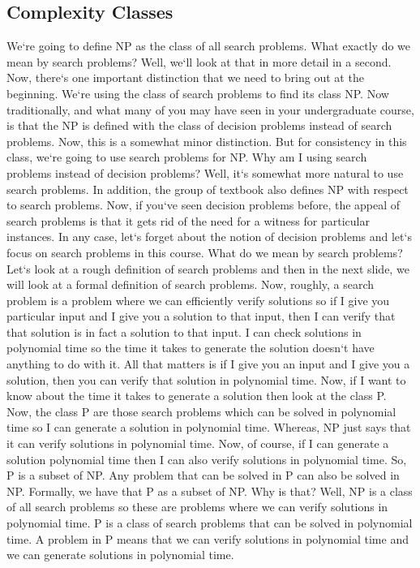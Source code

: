 \subsection{Complexity Classes}
We`re going to define NP as the class of all search problems.
What exactly do we mean by search problems? Well, we`ll look at that in more detail in a second.
Now, there`s one important distinction that we need to bring out at the beginning.
We`re using the class of search problems to find its class NP\@.
Now traditionally, and what many of you may have seen in your undergraduate course, is that the NP is defined with the class of decision problems instead of search problems.
Now, this is a somewhat minor distinction.
But for consistency in this class, we`re going to use search problems for NP\@.
Why am I using search problems instead of decision problems? Well, it`s somewhat more natural to use search problems.
In addition, the group of textbook also defines NP with respect to search problems.
Now, if you`ve seen decision problems before, the appeal of search problems is that it gets rid of the need for a witness for particular instances.
In any case, let`s forget about the notion of decision problems and let`s focus on search problems in this course.
What do we mean by search problems? Let`s look at a rough definition of search problems and then in the next slide, we will look at a formal definition of search problems.
Now, roughly, a search problem is a problem where we can efficiently verify solutions so if I give you particular input and I give you a solution to that input, then I can verify that that solution is in fact a solution to that input.
I can check solutions in polynomial time so the time it takes to generate the solution doesn`t have anything to do with it.
All that matters is if I give you an input and I give you a solution, then you can verify that solution in polynomial time.
Now, if I want to know about the time it takes to generate a solution then look at the class P\@.
Now, the class P are those search problems which can be solved in polynomial time so I can generate a solution in polynomial time.
Whereas, NP just says that it can verify solutions in polynomial time.
Now, of course, if I can generate a solution polynomial time then I can also verify solutions in polynomial time.
So, P is a subset of NP\@.
Any problem that can be solved in P can also be solved in NP\@.
Formally, we have that P as a subset of NP\@.
Why is that? Well, NP is a class of all search problems so these are problems where we can verify solutions in polynomial time.
P is a class of search problems that can be solved in polynomial time.
A problem in P means that we can verify solutions in polynomial time and we can generate solutions in polynomial time.

